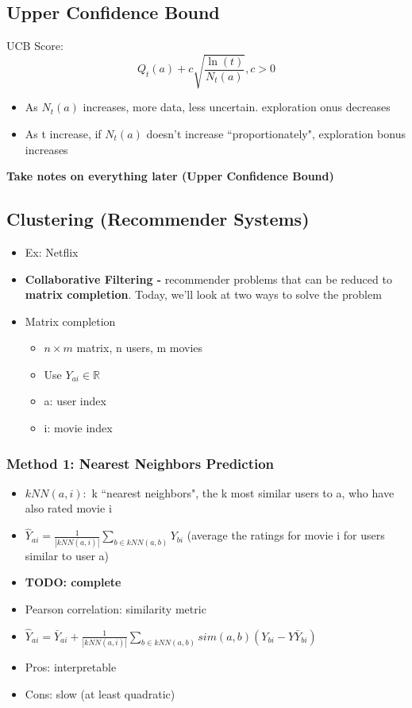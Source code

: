 \documentclass[10pt, oneside]{article}
\newcommand{\R}{\mathbb{R}}
\begin{document}
\subsection{Upper Confidence Bound}
UCB Score: \[Q_t(a) + c\sqrt{\frac{\ln(t)}{N_t(a)}}, c>0\]
\begin{itemize}
    \item As $N_t(a)$ increases, more data, less uncertain. exploration onus decreases
    \item As t increase, if $N_t(a)$ doesn't increase ``proportionately", exploration bonus increases
\end{itemize}

\textbf{Take notes on everything later (Upper Confidence Bound)}

\subsection{Clustering (Recommender Systems)}
\begin{itemize}
    \item Ex: Netflix
    \item \textbf{Collaborative Filtering - } recommender problems that can be reduced to \textbf{matrix completion}. Today, we'll look at two ways to solve the problem
    \item Matrix completion
    \begin{itemize}
        \item $n\times m$ matrix, n users, m movies
        \item Use $Y_{ai} \in \R$
        \item a: user index
        \item i: movie index
    \end{itemize}
\end{itemize}
\subsubsection{Method 1: Nearest Neighbors Prediction}
\begin{itemize}
    \item $kNN(a,i):$ k ``nearest neighbors", the k most similar users to a, who have also rated movie i
    \item $\hat Y_{ai} = \frac{1}{|kNN(a,i)|} \underset{b\in kNN(a,b)}{\sum} Y_{bi}$ (average the ratings for movie i for users similar to user a)
    \item \textbf{TODO: complete}
    \item Pearson correlation: similarity metric
    \item $\hat Y_{ai} = \bar Y_{ai} + \frac{1}{|kNN(a,i)|} \underset{b\in kNN(a,b)}{\sum} sim(a,b) (Y_{bi} - Y\bar Y_{bi})$
    \item Pros: interpretable
    \item Cons: slow (at least quadratic)
\end{itemize}
\end{document}
